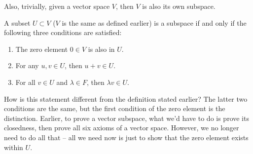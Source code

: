 Also, trivially, given a vector space \( V \), then \( V \) is also its own subspace. 

\begin{theorem}
	A subset \( U \subset V \) (\( V \) is the same as defined earlier) is a subspace if and only if the following 
	three conditions are satisfied:
	\begin{enumerate}[label=\alph*)]
		\item The zero element \( 0 \in V \) is also in \( U \). 
		\item For any \( u,v \in U \), then \( u + v \in U \). 
		\item For all \( v \in U \) and \( \lambda \in F \), then \( \lambda v \in U \). 
	\end{enumerate}
\end{theorem}
How is this statement different from the definition stated earlier? The latter two conditions are the same, but the 
first condition of the zero element is the distinction. Earlier, to prove a vector subspace, what we'd have to do is 
prove its closedness, then prove all six axioms of a vector space. However, we no longer need to do all that -- all we 
need now is just to show that the zero element exists within \( U \).
